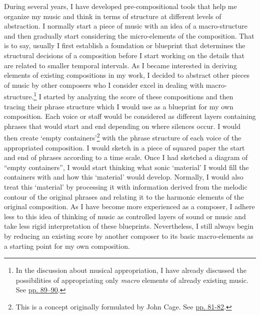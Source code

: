 During several years, I have developed pre-compositional tools that help me organize my music and think in terms of structure at different levels of abstraction. I normally start a piece of music with an idea of a macro-structure and then gradually start considering the micro-elements of the composition. That is to say, usually I first establish a foundation or blueprint that determines the structural decisions of a composition before I start working on the details that are related to smaller temporal intervals. As I became interested in deriving elements of existing compositions in my work, I decided to abstract other pieces of music by other composers who I consider excel in dealing with macro-structure.\footnote{In the discussion about musical appropriation, I have already discussed the possibilities of appropriating only \emph{macro} elements of already existing music. See \hyperlink{macroplunder}{pp. 89--90}.} I started by analyzing the score of these compositions and then tracing their phrase structure which I would use as a blueprint for my own composition. Each voice or staff would be considered as different layers containing phrases that would start and end depending on where silences occur. I would then create `empty containers'\footnote{This is a concept originally formulated by John Cage. See \hyperlink{landscape5}{pp. 81-82}.} with the phrase structure of each voice of the appropriated composition. I would sketch in a piece of squared paper the start and end of phrases according to a time scale. Once I had sketched a diagram of ``empty containers'', I would start thinking what sonic `material' I would fill the containers with and how this `material' would develop. Normally, I would also treat this `material' by processing it with information derived from the melodic contour of the original phrases and relating it to the harmonic elements of the original composition. As I have become more experienced as a composer, I adhere less to this idea of thinking of music as controlled layers of sound or music and take less rigid interpretation of these blueprints. Nevertheless, I still always begin by reducing an existing score by another composer to its basic macro-elements as a starting point for my own composition. 

